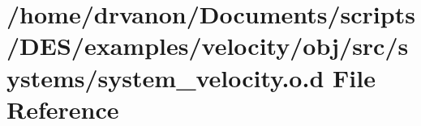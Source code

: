 \hypertarget{examples_2velocity_2obj_2src_2systems_2system__velocity_8o_8d}{}\section{/home/drvanon/\+Documents/scripts/\+D\+E\+S/examples/velocity/obj/src/systems/system\+\_\+velocity.o.\+d File Reference}
\label{examples_2velocity_2obj_2src_2systems_2system__velocity_8o_8d}
